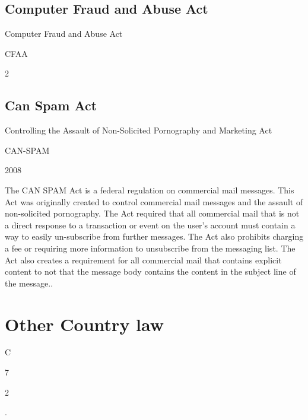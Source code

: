 \documentclass[14pt]{article}
\begin{document}
\subsection{Computer Fraud and Abuse Act}
    \begin{description}[leftmargin=!, labelwidth=\widthof{\bfseries Year Approved}]
        \item [Name] Computer Fraud and Abuse Act
        \item [Abbreviation] CFAA
        \item [Year Approved] 2
        \item [Description] \cite{CFAA}
    \end{description}
\subsection{Can Spam Act}
    \begin{description}[leftmargin=!, labelwidth=\widthof{\bfseries Year Approved}]
        \item [Name] Controlling the Assault of Non-Solicited Pornography and Marketing Act
        \item [Abbreviation] CAN-SPAM
        \item [Year Approved] 2008
        \item [Description] The CAN SPAM Act is a federal regulation on commercial mail messages. This Act was originally created to control commercial mail messages and the assault of non-solicited pornography. The Act required that all commercial mail that is not a direct response to a transaction or event on the user's account must contain a way to easily un-subscribe from further messages. The Act also prohibits charging a fee or requiring more information to unsubscribe from the messaging list. The Act also creates a requirement for all commercial mail that contains explicit content to not that the message body contains the content in the subject line of the message.\cite{CANSPAM}.
    \end{description}
    
\section{Other Country law}
    \begin{description}[leftmargin=!, labelwidth=\widthof{\bfseries Year Approved}]
        \item [Name] C
        \item [Abbreviation] 7
        \item [Year Approved] 2
        \item [Description] \cite{GDPR}.
    \end{description}

\newpage


\end{document}
